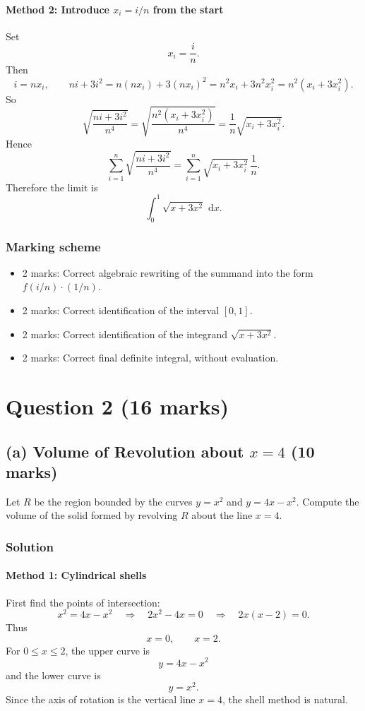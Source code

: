 \documentclass[12pt]{article}
\newcommand{\dd}{\,\mathrm{d}}
\begin{document}
\newpage
\paragraph{Method 2: Introduce \(x_i=i/n\) from the start}
Set
\[
x_i=\frac{i}{n}.
\]
Then
\[
i=nx_i,
\qquad
ni+3i^2=n(nx_i)+3(nx_i)^2=n^2x_i+3n^2x_i^2=n^2(x_i+3x_i^2).
\]
So
\[
\sqrt{\frac{ni+3i^2}{n^4}}
=\sqrt{\frac{n^2(x_i+3x_i^2)}{n^4}}
=\frac{1}{n}\sqrt{x_i+3x_i^2}.
\]
Hence
\[
\sum_{i=1}^{n}\sqrt{\frac{ni+3i^2}{n^4}}
=\sum_{i=1}^{n}\sqrt{x_i+3x_i^2}\,\frac{1}{n}.
\]
Therefore the limit is
\[
\boxed{\int_0^1 \sqrt{x+3x^2}\,\dd x.}
\]

\subsubsection{Marking scheme}
\begin{itemize}
\item 2 marks: Correct algebraic rewriting of the summand into the form \(f(i/n)\cdot (1/n)\).
\item 2 marks: Correct identification of the interval \([0,1]\).
\item 2 marks: Correct identification of the integrand \(\sqrt{x+3x^2}\).
\item 2 marks: Correct final definite integral, without evaluation.
\end{itemize}

\newpage

\section{Question 2 \hfill (16 marks)}

\subsection{(a) Volume of Revolution about \(x=4\) \hfill (10 marks)}

Let \(R\) be the region bounded by the curves \(y=x^2\) and \(y=4x-x^2\). Compute the volume of the solid formed by revolving \(R\) about the line \(x=4\).

\subsubsection{Solution}

\paragraph{Method 1: Cylindrical shells}
First find the points of intersection:
\[
x^2=4x-x^2
\quad\Longrightarrow\quad
2x^2-4x=0
\quad\Longrightarrow\quad
2x(x-2)=0.
\]
Thus
\[
x=0,\qquad x=2.
\]
For \(0\le x\le 2\), the upper curve is
\[
y=4x-x^2
\]
and the lower curve is
\[
y=x^2.
\]
Since the axis of rotation is the vertical line \(x=4\), the shell method is natural.
\end{document}
